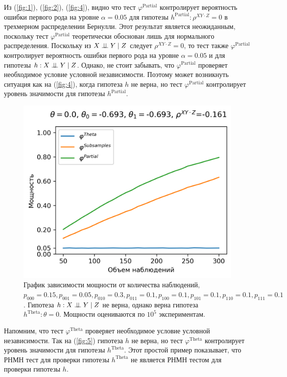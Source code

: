 Из (\autoref{fig:1}), (\autoref{fig:2}), (\autoref{fig:4}),
видно
что тест $\varphi^{\text{Partial}}$ контролирует вероятность
ошибки первого рода на уровне $\alpha=0.05$ для гипотезы
$h^\text{Partial}: \rho^{XY\cdot Z}=0$ в трехмерном
распределении Бернулли. Этот результат является неожиданным,
поскольку тест $\varphi^{\text{Partial}}$ теоретически обоснован
лишь для нормального распределения.
Поскольку из $X \perp\!\!\!\perp Y \mid Z$
следует $\rho^{XY\cdot Z}=0$, то тест также $\varphi^{\text{Partial}}$
контролирует вероятность ошибки первого рода на уровне $\alpha=0.05$
и для гипотезы $h: X \perp\!\!\!\perp Y \mid Z$. Однако, не стоит забывать,
что $\varphi^{\text{Partial}}$ проверяет необходимое условие 
условной независимости. Поэтому может возникнуть ситуация
как на (\autoref{fig:4}), когда гипотеза $h$ не верна, 
но тест $\varphi^{\text{Partial}}$ контролирует уровень значимости для гипотезы $h^{\text{Partial}}$.

\begin{figure}[H]
    \centering
    \includegraphics[scale=0.55]{images/graph5.png}
    \caption{График зависимости мощности от количества наблюдений,
    $p_{000}=0.15, p_{001}=0.05, 
    p_{010}=0.3, p_{011}=0.1,
    p_{100}=0.1, p_{101}=0.1, p_{110}=0.1, p_{111}=0.1$. 
    Гипотеза $h: X \perp\!\!\!\perp Y \mid Z$ не верна, однако верна гипотеза $h^{\text{Theta}}: \theta=0$.
    Мощности оцениваются по $10^5$ экспериментам.} \label{fig:5}
\end{figure}

Напомним, что тест 
$\varphi^{\text{Theta}}$ проверяет необходимое условие условной
независимости. Так на (\autoref{fig:5}) гипотеза 
$h$ не верна, 
но тест $\varphi^{\text{Theta}}$ контролирует уровень значимости для гипотезы $h^{\text{Theta}}$.
Этот простой пример показывает, что РНМН тест для проверки гипотезы
$h^{\text{Theta}}$ не является РНМН тестом для 
проверки гипотезы $h$.

